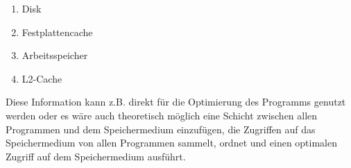\begin{enumerate}
	\item Disk
	\item Festplattencache
	\item Arbeitsspeicher
	\item L2-Cache
\end{enumerate}

Diese Information kann z.B. direkt für die Optimierung des Programms genutzt werden oder es wäre auch theoretisch möglich eine Schicht zwischen allen Programmen und dem Speichermedium einzufügen, die Zugriffen auf das Speichermedium von allen Programmen sammelt, ordnet und einen optimalen Zugriff auf dem Speichermedium ausführt.
